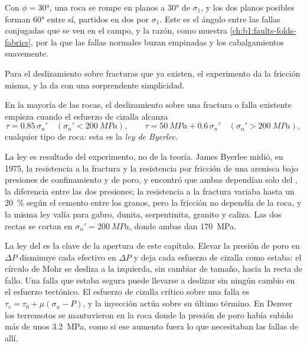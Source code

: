 Con $\phi = \ang{30}$, una roca se rompe en planos a \ang{30} de $\sigma_1$, y los dos planos posibles forman \ang{60} entre sí, partidos en dos por
$\sigma_1$. Este es el ángulo entre las fallas conjugadas que se ven en el campo, y la razón, como muestra \cref{ch:b1:faults-folds-fabrics}, por la que las
fallas normales buzan empinadas y los cabalgamientos suavemente.

Para el deslizamiento sobre fracturas que ya existen, el experimento da la fricción misma, y la da con una sorprendente simplicidad.

\begin{proposition}\label{prop:b1:stress-strain-rheology:byerlee}
En la mayoría de las rocas, el deslizamiento sobre una fractura o falla existente empieza cuando el esfuerzo de cizalla alcanza
\[
  \tau = 0.85\,\sigma_n' \quad (\sigma_n' < \qty{200}{MPa}), \qquad
  \tau = \qty{50}{MPa} + 0.6\,\sigma_n' \quad (\sigma_n' > \qty{200}{MPa}),
\]
cualquier tipo de roca: esta es la \emph{ley de Byerlee}.
\end{proposition}
\admitted

La ley es resultado del experimento, no de la teoría. James Byerlee midió, en 1975, la resistencia a la fractura y la resistencia por fricción de una arenisca
bajo presiones de confinamiento y de poro, y encontró que ambas dependían solo del , la diferencia entre las dos presiones; la resistencia a la
fractura variaba hasta un \qty{20}{\percent} según el cemento entre los granos, pero la fricción no dependía de la roca, y la misma ley valía para gabro, dunita,
serpentinita, granito y caliza. Las dos rectas se cortan en $\sigma_n' = \qty{200}{MPa}$, donde ambas dan \qty{170}{MPa}.

La ley del  es la clave de la apertura de este capítulo. Elevar la presión de poro en $\Delta P$ disminuye cada  efectivo en
$\Delta P$ y deja cada esfuerzo de cizalla como estaba: el círculo de Mohr se desliza a la izquierda, sin cambiar de tamaño, hacia la recta de fallo. Una falla
que estaba segura puede llevarse a deslizar sin ningún cambio en el esfuerzo tectónico. El esfuerzo de cizalla crítico sobre una falla es $\tau_c = \tau_0 + \mu(\sigma_n - P)$,
y la inyección actúa sobre su último término. En Denver los terremotos se mantuvieron en la roca donde la presión de poro había subido más de unos \qty{3.2}{MPa},
como si ese aumento fuera lo que necesitaban las fallas de allí.

